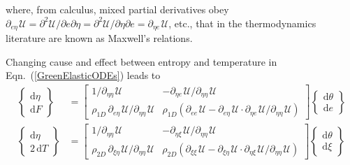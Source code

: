 where, from calculus, mixed partial derivatives obey $\partial_{e\eta\,} \mathcal{U} = \partial^2 \mathcal{U} / \partial e \partial \eta = \partial^2 \mathcal{U} / \partial \eta \partial e = \partial_{\eta e\,} \mathcal{U}$, etc., that in the thermo\-dynamics literature are known as Maxwell's relations.

Changing cause and effect between entropy and temperature in Eqn.~(\ref{GreenElasticODEs}) leads to
\begin{subequations}
    \label{HelmholtzElasticODEs}
    \begin{align}
    \left\{ \begin{matrix} \mathrm{d} \eta \\ 
    \mathrm{d} F \end{matrix} \right\} & = \begin{bmatrix}
    1/\partial_{\eta\eta\,} \mathcal{U} & -\partial_{\eta e\,} \mathcal{U} / 
    \partial_{\eta\eta\,} \mathcal{U} \\
    \rho_{1D} \, \partial_{e\eta\,} \mathcal{U} / \partial_{\eta\eta\,} \mathcal{U} & \rho_{1D} ( \partial_{ee\,} \mathcal{U} - \partial_{e\eta\,} \mathcal{U} \!\cdot\! \partial_{\eta e\,} \mathcal{U} / \partial_{\eta\eta\,} \mathcal{U} ) \end{bmatrix} 
    \left\{ \begin{matrix} \mathrm{d} \theta \\
    \mathrm{d} e \end{matrix} \right\} \\
    \left\{ \begin{matrix} \mathrm{d} \eta \\ 
    2 \, \mathrm{d} T \end{matrix} \right\} & = \begin{bmatrix}
    1/\partial_{\eta\eta\,} \mathcal{U} & -\partial_{\eta \xi\,} \mathcal{U} / \partial_{\eta\eta\,} \mathcal{U} \\
    \rho_{2D} \, \partial_{\xi\eta\,} \mathcal{U} / \partial_{\eta\eta\,} \mathcal{U} & \rho_{2D} ( \partial_{\xi\xi\,} \mathcal{U} - \partial_{\xi\eta\,} \mathcal{U} \!\cdot\! \partial_{\eta\xi\,} \mathcal{U} / \partial_{\eta\eta\,} \mathcal{U} ) \end{bmatrix} \left\{ \begin{matrix} \mathrm{d} \theta \\
    \mathrm{d} \xi \end{matrix} \right\} \label{HelmholtzMembrane} \\

\end{align}
\end{subequations}
